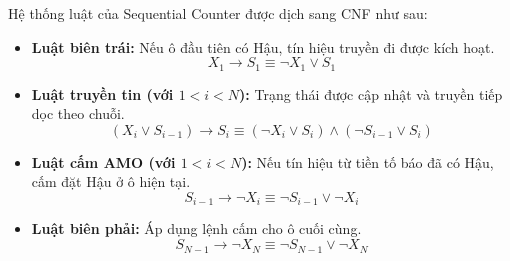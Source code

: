 \documentclass[a4paper,fleqn]{cas-sc}
\begin{document}
    Hệ thống luật của Sequential Counter được dịch sang CNF như sau:
    \begin{itemize}
        \item \textbf{Luật biên trái:} Nếu ô đầu tiên có Hậu, tín hiệu truyền đi được kích hoạt.
        \begin{equation}\label{eq:seq_left}
            X_1 \to S_1 \equiv \neg X_1 \lor S_1
        \end{equation}

        \item \textbf{Luật truyền tin (với $1 < i < N$):} Trạng thái được cập nhật và truyền tiếp dọc theo chuỗi.
        \begin{equation}\label{eq:seq_mid_prop}
            (X_i \lor S_{i-1}) \to S_i \equiv (\neg X_i \lor S_i) \land (\neg S_{i-1} \lor S_i)
        \end{equation}

        \item \textbf{Luật cấm AMO (với $1 < i < N$):} Nếu tín hiệu từ tiền tố báo đã có Hậu, cấm đặt Hậu ở ô hiện tại.
        \begin{equation}\label{eq:seq_mid_ban}
            S_{i-1} \to \neg X_i \equiv \neg S_{i-1} \lor \neg X_i
        \end{equation}

        \item \textbf{Luật biên phải:} Áp dụng lệnh cấm cho ô cuối cùng.
        \begin{equation}\label{eq:seq_right}
            S_{N-1} \to \neg X_N \equiv \neg S_{N-1} \lor \neg X_N
        \end{equation}
    \end{itemize}
\end{document}
